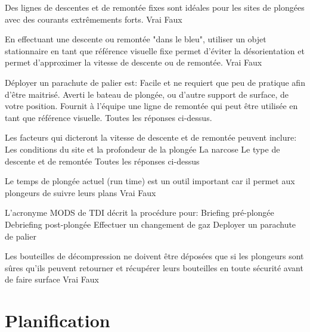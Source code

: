 \documentclass[english,10pt,a4paper,twoside]{article}
\begin{document}
\begin{outline}
		\1 Des lignes de descentes et de remontée fixes sont idéales pour les sites de plongées avec des courants extrêmements forts.
			\2 Vrai
			\2 Faux

		\1 En effectuant une descente ou remontée "dans le bleu", utiliser un objet stationnaire en tant que référence visuelle fixe permet d'éviter la désorientation et permet d'approximer la vitesse de descente ou de remontée.
			\2 Vrai
			\2 Faux

		\1 Déployer un parachute de palier est:
			\2 Facile et ne requiert que peu de pratique afin d'être maitrisé.
			\2 Averti le bateau de plongée, ou d'autre support de surface, de votre position.
			\2 Fournit à l'équipe une ligne de remontée qui peut être utilisée en tant que référence visuelle.
			\2 Toutes les réponses ci-dessus.

		\1 Les facteurs qui dicteront la vitesse de descente et de remontée peuvent inclure:
			\2 Les conditions du site et la profondeur de la plongée
			\2 La narcose
			\2 Le type de descente et de remontée
			\2  Toutes les réponses ci-dessus

		\1 Le temps de plongée actuel (run time) est un outil important car il permet aux plongeurs de suivre leurs plans
			\2 Vrai
			\2 Faux

		\1 L'acronyme MODS de TDI décrit la procédure pour:
			\2 Briefing pré-plongée
			\2 Debriefing post-plongée
			\2 Effectuer un changement de gaz
			\2 Deployer un parachute de palier

		\1 Les bouteilles de décompression ne doivent être déposées que si les plongeurs sont sûres qu'ils peuvent retourner et récupérer leurs bouteilles en toute sécurité avant de faire surface
			\2 Vrai
			\2 Faux
	\end{outline}
	\vfill
	\pagebreak

	\section{Planification}
\end{document}
